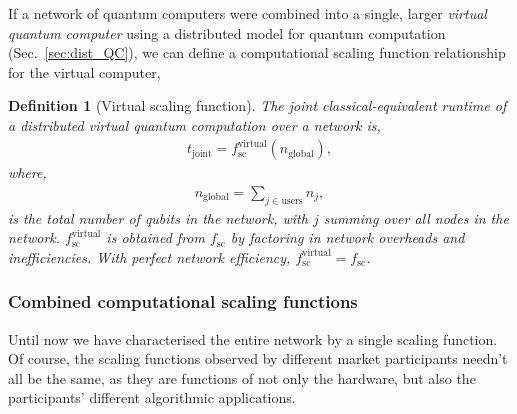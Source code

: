 \documentclass[aps, rmp, twocolumn, amsmath, amssymb, nofootinbib, superscriptaddress, longbibliography, floatfix, table-of-contents, eqsecnum]{revtex4-1}
\newtheorem{definition}{Definition}
\begin{document}
If a network of quantum computers were combined into a single, larger \textit{virtual quantum computer} using a distributed model for quantum computation (Sec.~\ref{sec:dist_QC}), we can define a computational scaling function relationship for the virtual computer,

\begin{definition}[Virtual scaling function]
The joint classical-equivalent runtime of a distributed virtual quantum computation over a network is,
\begin{align}
t_\text{joint} = f_\text{sc}^\text{virtual}(n_\text{global}),
\end{align}
where,
\begin{align}
n_\text{global} = \sum_{j\in\text{users}} n_j,
\end{align}
is the total number of qubits in the network, with $j$ summing over all nodes in the network. $f_\text{sc}^\text{virtual}$ is obtained from $f_\text{sc}$ by factoring in network overheads and inefficiencies. With perfect network efficiency, \mbox{$f_\text{sc}^\text{virtual}=f_\text{sc}$}.
\end{definition}

%
%

\subsubsection{Combined computational scaling functions}

Until now we have characterised the entire network by a single scaling function. Of course, the scaling functions observed by different market participants needn't all be the same, as they are functions of not only the hardware, but also the participants' different algorithmic applications.
\end{document}
